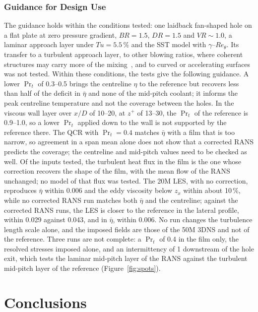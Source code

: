 \documentclass[colorlinks,upint,subscriptcorrection,varvw,hyphenate,balance,lineno]{asmeconf}
\newcommand*{\BR}{\mathit{BR}}
\newcommand*{\DR}{\mathit{DR}}
\newcommand*{\VR}{\mathit{VR}}
\newcommand*{\Reth}{\mathit{Re}_\theta}
\newcommand*{\Tu}{\mathit{Tu}}
\newcommand*{\etab}{\bar\eta}
\begin{document}
\subsubsection{Guidance for Design Use}

The guidance holds within the conditions tested: one laidback fan-shaped hole on a flat plate at zero pressure
gradient, $\BR=1.5$, $\DR=1.5$ and $\VR\sim1.0$, a laminar approach layer under $\Tu=5.5$\,\% and the SST model
with $\gamma$--$\Reth$. Its transfer to a turbulent approach layer, to other blowing ratios, where coherent
structures may carry more of the mixing~\cite{fawcett2013}, and to curved or accelerating surfaces was not tested.
Within these conditions, the tests give the following guidance. A lower $\Pr_t$
of 0.3--0.5 brings the centreline $\eta$ to the reference but recovers less than half of the deficit in $\etab$
and none of the mid-pitch coolant; it informs the peak centreline temperature and not the coverage between the
holes. In the viscous wall layer over $x/D$ of 10--20, at $z^+$ of 13--30, the $\Pr_t$ of the reference is 0.9--1.0, so a lower
$\Pr_t$ applied down to the wall is not supported by the reference there. The QCR with $\Pr_t=0.4$ matches $\etab$ with a film that is too narrow, so agreement in a span mean alone
does not show that a corrected RANS predicts the coverage; the centreline and mid-pitch values need to be checked
as well. Of the inputs tested, the turbulent heat flux in the film is the one whose correction recovers the shape
of the film, with the mean flow of the RANS unchanged; no model of that flux was tested. The 20M LES, with no
correction, reproduces $\etab$ within 0.006 and the eddy viscosity below $z_x$ within about 10\,\%, while no
corrected RANS run matches both $\etab$ and the centreline; against the corrected RANS runs, the LES is closer to
the reference in the lateral profile, within 0.029 against 0.043, and in $\etab$, within 0.006. No run changes the
turbulence length scale alone, and the imposed fields are those of the 50M 3DNS and not of the reference. Three
runs are not complete: a $\Pr_t$ of 0.4 in the film only, the resolved stresses imposed alone, and an
intermittency of 1 downstream of the hole exit, which tests the laminar mid-pitch layer of the RANS against the
turbulent mid-pitch layer of the reference (Figure~\ref{fig:spots}).

\section{Conclusions}\label{sec:conclusions}
\end{document}
